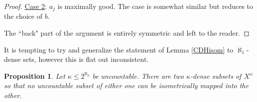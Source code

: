 \documentclass[leqno,11pt]{amsart}
\newtheorem{proposition}[theorem]{Proposition}
\theoremstyle{definition}
\theoremstyle{remark}
\def\hook{\upharpoonright}
\def\cc{2^{\aleph_0}}
\begin{document}
\begin{proof}
    \noindent \underline{Case 2}: $a_j$ is maximally good. The case is somewhat similar but reduces to the choice of $b$.





    The ``back" part of the argument is entirely symmetric and left to the reader. 
    
\end{proof}

It is tempting to try and generalize the statement of Lemma \ref{CDHisom} to $\aleph_1$-dense sets, however this is flat out inconsistent. 
\begin{proposition}
    Let $\kappa \leq \cc$ be uncountable. There are two $\kappa$-dense subsets of $X^\omega$ so that no uncountable subset of either one can be isometrically mapped into the other. \label{counterexample}
\end{proposition}
\end{document}
